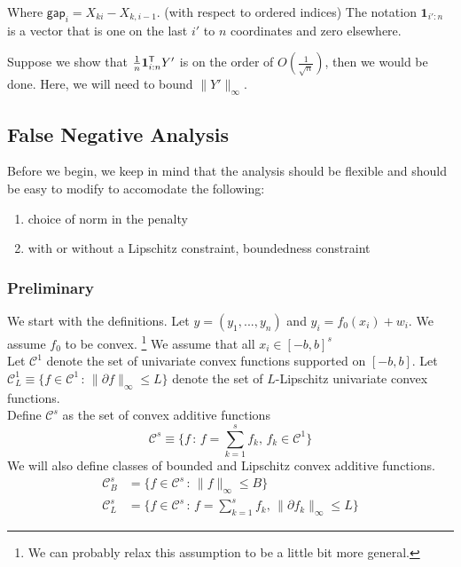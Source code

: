 \documentclass{article}
\begin{document}
Where $\mathsf{gap}_i = X_{ki} - X_{k,i-1}$. (with respect to ordered indices) The notation $\mathbf{1}_{i':n}$ is a vector that is one on the last $i'$ to $n$ coordinates and zero elsewhere.

Suppose we show that $\frac{1}{n} \mathbf{1}_{i:n}^{\mathsf{T}} Y'$ is on the order of $O( \frac{1}{\sqrt{n}})$, then we would be done. Here, we will need to bound $\| Y' \|_\infty$.

\subsection{False Negative Analysis}

Before we begin, we keep in mind that the analysis should be flexible and should be easy to modify to accomodate the following:
\begin{enumerate}
\item choice of norm in the penalty
\item with or without a Lipschitz constraint, boundedness constraint
\end{enumerate}

\subsubsection{Preliminary}
We start with the definitions. Let $y = (y_1, ..., y_n)$ and $y_i = f_0(x_i) + w_i$. We assume $f_0$ to be convex. \footnote{We can probably relax this assumption to be a little bit more general.} We assume that all $x_i \in [-b, b]^s$ \\

Let $\mathcal{C}^1$ denote the set of univariate convex functions supported on $[-b,b]$. Let $\mathcal{C}^1_L \equiv \{ f \in \mathcal{C}^1 \,:\, \| \partial f \|_\infty \leq L \}$ denote the set of $L$-Lipschitz univariate convex functions. \\

Define $\mathcal{C}^s$ as the set of convex additive functions
\[
\mathcal{C}^s \equiv \{ f \,:\, f = \sum_{k=1}^s f_k, \,
   f_k \in \mathcal{C}^1 \}
\]
We will also define classes of bounded and Lipschitz convex additive functions. 
\begin{align*}
\mathcal{C}^s_B &= \{ f \in \mathcal{C}^s \,:\, 
  \| f \|_\infty \leq B \} \\
\mathcal{C}^s_L &= \{ f \in \mathcal{C}^s \,:\, 
f = \sum_{k=1}^s f_k, \, \| \partial f_k \|_\infty \leq L \}
\end{align*}
\end{document}

